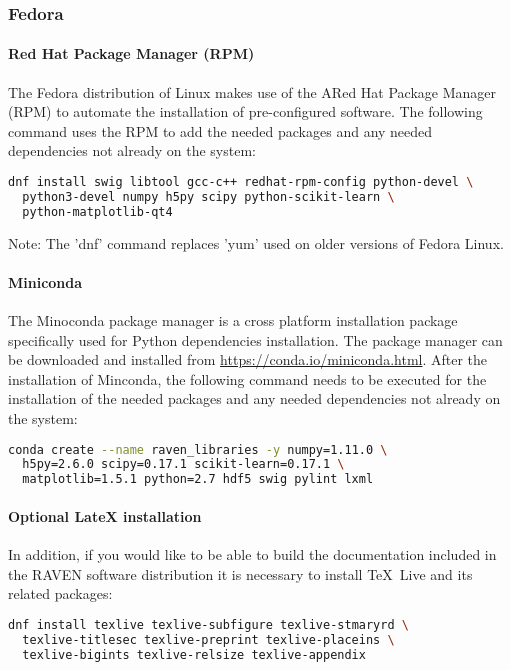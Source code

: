 \goToRavenInstallation

\subsubsection{Fedora}

\paragraph{Red Hat Package Manager (RPM)}
The Fedora distribution of Linux makes use of the ARed Hat Package Manager (RPM)
to automate the installation of pre-configured software. The
following command uses the RPM to add the needed packages and any
needed dependencies not already on the system:

\begin{lstlisting}[language=bash]
dnf install swig libtool gcc-c++ redhat-rpm-config python-devel \
  python3-devel numpy h5py scipy python-scikit-learn \
  python-matplotlib-qt4
\end{lstlisting}

Note: The 'dnf' command replaces 'yum' used on older versions of
Fedora Linux.

\paragraph{Miniconda}
The Minoconda package manager is a cross platform installation package specifically 
used for Python dependencies installation.
The package manager can be downloaded and installed from \url{https://conda.io/miniconda.html}.
After the installation of Minconda, the following command needs to be executed for the installation of
the needed packages and any needed dependencies not already on the system:

\begin{lstlisting}[language=bash]
 conda create --name raven_libraries -y numpy=1.11.0 \
  h5py=2.6.0 scipy=0.17.1 scikit-learn=0.17.1 \
  matplotlib=1.5.1 python=2.7 hdf5 swig pylint lxml
\end{lstlisting}

\paragraph{Optional LateX installation}
In addition, if you would like to be able to build the documentation
included in the RAVEN software distribution it is necessary to install
\TeX~Live and its related packages:
\begin{lstlisting}[language=bash]
dnf install texlive texlive-subfigure texlive-stmaryrd \
  texlive-titlesec texlive-preprint texlive-placeins \
  texlive-bigints texlive-relsize texlive-appendix
\end{lstlisting}

